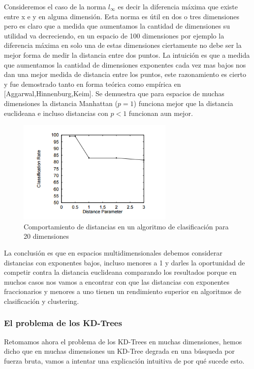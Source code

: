 Consideremos el caso de la norma $l_{\infty}$ es decir la diferencia máxima que existe entre x e y en alguna dimensión. Esta norma es útil en dos o tres dimensiones pero es claro que a medida que aumentamos la cantidad de dimensiones su utilidad va decreciendo, en un espacio de 100 dimensiones por ejemplo la diferencia máxima en solo una de estas dimensiones ciertamente no debe ser la mejor forma de medir la distancia entre dos puntos. La intuición es que a medida que aumentamos la cantidad de dimensiones exponentes cada vez mas bajos nos dan una mejor medida de distancia entre los puntos, este razonamiento es cierto y fue demostrado tanto en forma teórica como empírica en [Aggarwal,Hinnenburg,Keim]. Se demuestra que para espacios de muchas dimensiones la distancia Manhattan ($p=1$) funciona mejor que la distancia euclideana e incluso distancias con $p<1$ funcionan aun mejor. 

\begin{figure}[!htb]
\centering
\includegraphics[width=3in]{figures/distancias-fig.png}
\caption{Comportamiento de distancias en un algoritmo de clasificación para 20 dimensiones}

\end{figure}

La conclusión es que en espacios multidimensionales debemos considerar distancias con exponentes bajos, incluso menores a 1 y darles la oportunidad de competir contra la distancia euclideana comparando los resultados porque en muchos casos nos vamos a encontrar con que las distancias con exponentes fraccionarios y menores a uno tienen un rendimiento superior en algoritmos de clasificación y clustering.

\subsubsection{El problema de los KD-Trees}

Retomamos ahora el problema de los KD-Trees en muchas dimensiones, hemos dicho que en muchas dimensiones un KD-Tree degrada en una búsqueda por fuerza bruta, vamos a intentar una explicación intuitiva de por qué sucede esto. 

